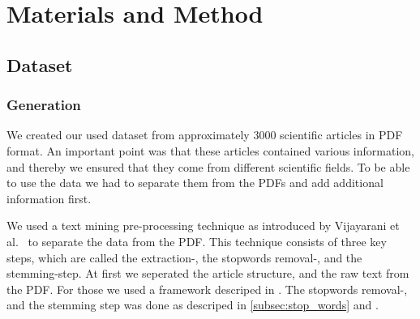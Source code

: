 \chapter{Materials and Method}
\label{cha:materials_and_method}

\section{Dataset}
\label{sec:dataset}

\subsection{Generation}
\label{subsec:generation}

We created our used dataset from approximately 3000 scientific articles in PDF format. An important point was that these articles contained various information, and thereby we ensured that they come from different scientific fields. To be able to use the data we had to separate them from the PDFs and add additional information first.

We used a text mining pre-processing technique as introduced by Vijayarani et al.~\cite{Vijayarani2015} to separate the data from the PDF. This technique consists of three key steps, which are called the extraction-, the stopwords removal-, and the stemming-step. At first we seperated the article structure, and the raw text from the PDF. For those we used a framework descriped in . The stopwords removal-, and the stemming step was done as descriped in \cref{subsec:stop_words} and .

